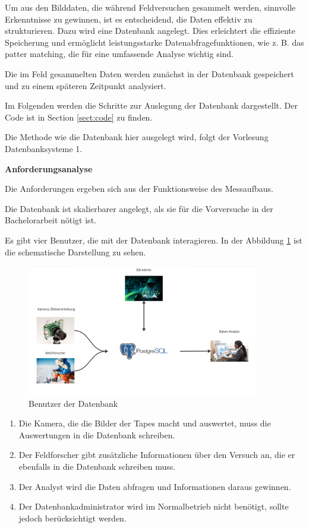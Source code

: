 
Um aus den Bilddaten, die während Feldversuchen gesammelt werden, sinnvolle Erkenntnisse zu gewinnen, ist es entscheidend, die Daten effektiv zu strukturieren. Dazu wird eine Datenbank angelegt. Dies erleichtert die effiziente Speicherung und ermöglicht leistungsstarke Datenabfragefunktionen, wie z. B. das patter matching, die für eine umfassende Analyse wichtig sind.

Die im Feld gesammelten Daten werden zunächst in der Datenbank gespeichert und zu einem späteren Zeitpunkt analysiert.

Im Folgenden werden die Schritte zur Auslegung der Datenbank dargestellt. Der Code ist in Section \ref{sect:code} zu finden.

Die Methode wie die Datenbank hier ausgelegt wird, folgt der Vorlesung Datenbanksysteme 1.

\textbf{Anforderungsanalyse}

Die Anforderungen ergeben sich aus der Funktionsweise des Messaufbaus.

Die Datenbank ist skalierbarer angelegt, als sie für die Vorversuche in der Bachelorarbeit nötigt ist.

Es gibt vier Benutzer, die mit der Datenbank interagieren. In der Abbildung \ref{fig:user-db-entwurf} ist die schematische Darstellung zu sehen.

\begin{figure}
    \centering
    \includegraphics[width=0.9\textwidth]{Bilder/Screenshotfrom2024-04-0115-26-08.png}
    \caption{Benutzer der Datenbank}
    \label{fig:user-db-entwurf}
\end{figure}

\begin{enumerate}
\item Die Kamera, die die Bilder der Tapes macht und auswertet, muss die Auswertungen in die Datenbank schreiben.
  \item Der Feldforscher gibt zusätzliche Informationen über den Versuch an, die er ebenfalls in die Datenbank schreiben muss.
    
    \item Der Analyst wird die Daten abfragen und Informationen daraus gewinnen.
    
    \item Der Datenbankadministrator wird im Normalbetrieb nicht benötigt, sollte jedoch berücksichtigt werden.
\end{enumerate}

